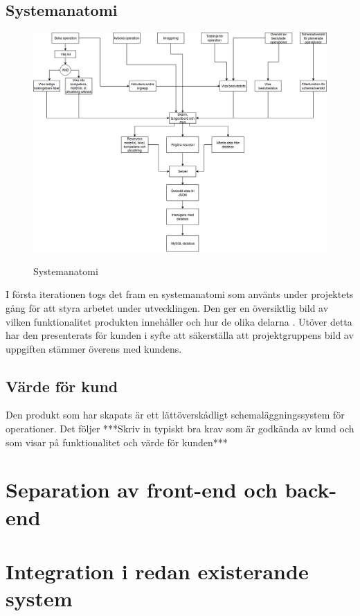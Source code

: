 \subsection{Systemanatomi}
\begin{figure}
\includegraphics[width=\textwidth,height=.4\textheight]{Figures/Systemanatomi.png}\\
\caption{Systemanatomi}
\label{fig:Systemanatomi}
\end{figure}

I första iterationen togs det fram en systemanatomi som använts under projektets gång för att styra arbetet under utvecklingen. Den ger en översiktlig bild av vilken funktionalitet produkten innehåller och hur de olika delarna . Utöver detta har den presenterats för kunden i syfte att säkerställa att projektgruppens bild av uppgiften stämmer överens med kundens. 

\subsection{Värde för kund}
Den produkt som har skapats är ett lättöverskådligt schemaläggningssystem för operationer. Det följer ***Skriv in typiskt bra krav som är godkända av kund och som visar på funktionalitet och värde för kunden***

\section{Separation av front-end och back-end}

\section{Integration i redan existerande system}


